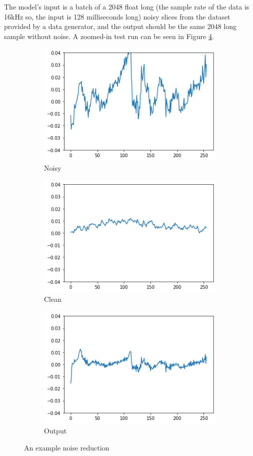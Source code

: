 \documentclass{article}
\begin{document}
	The model's input is a batch of a 2048 float long (the sample rate of the data is 16kHz so, the input is 128 milliseconds long) noisy slices from the dataset provided by a data generator, and the output should be the same 2048 long sample without noise. A zoomed-in test run can be seen in Figure \ref{fig:test}. 
	
	\begin{figure}[htbp]
		\centering
		\begin{subfigure}{.5\textwidth}
			\centering
			\includegraphics[width=.8\linewidth]{test_noisy}
			\caption{Noisy}
			\label{fig:test_noisy}
		\end{subfigure}%
		\begin{subfigure}{.5\textwidth}
			\centering
			\includegraphics[width=.8\linewidth]{test_clean_orig}
			\caption{Clean}
			\label{fig:test_clean_orig}
		\end{subfigure}
		\begin{subfigure}{1\textwidth}
			\centering
			\includegraphics[width=.4\linewidth]{test_clean}
			\caption{Output}
			\label{fig:test_clean}
		\end{subfigure}
		\caption{An example noise reduction}
		\label{fig:test}
	\end{figure}
\end{document}
